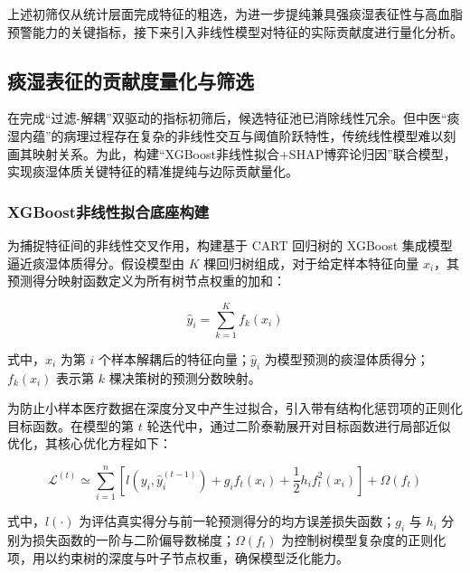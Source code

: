 \documentclass[12pt]{article}
\begin{document}
	{\songti{}
		上述初筛仅从统计层面完成特征的粗选，为进一步提纯兼具强痰湿表征性与高血脂预警能力的关键指标，接下来引入非线性模型对特征的实际贡献度进行量化分析。
		\par}
	
	\subsection{痰湿表征的贡献度量化与筛选}
	{\songti{}
		在完成“过滤-解耦”双驱动的指标初筛后，候选特征池已消除线性冗余。但中医“痰湿内蕴”的病理过程存在复杂的非线性交互与阈值阶跃特性，传统线性模型难以刻画其映射关系。为此，构建“XGBoost非线性拟合+SHAP博弈论归因”联合模型，实现痰湿体质关键特征的精准提纯与边际贡献量化。
		\par}
	
	\subsubsection{XGBoost非线性拟合底座构建}
	{\songti{}
		为捕捉特征间的非线性交叉作用，构建基于 CART 回归树的 XGBoost 集成模型逼近痰湿体质得分。假设模型由 $K$ 棵回归树组成，对于给定样本特征向量 $x_i$，其预测得分映射函数定义为所有树节点权重的加和：
		\par}
	
	\begin{equation}
		\hat{y}_i = \sum_{k=1}^{K} f_k(x_i)
	\end{equation}
	
	{\songti{}
		式中，$x_i$ 为第 $i$ 个样本解耦后的特征向量；$\hat{y}_i$ 为模型预测的痰湿体质得分；$f_k(x_i)$ 表示第 $k$ 棵决策树的预测分数映射。
		\par}
	
	{\songti{}
		为防止小样本医疗数据在深度分叉中产生过拟合，引入带有结构化惩罚项的正则化目标函数。在模型的第 $t$ 轮迭代中，通过二阶泰勒展开对目标函数进行局部近似优化，其核心优化方程如下：
		\par}
	
	\begin{equation}
		\mathcal{L}^{(t)} \simeq \sum_{i=1}^{n} \left[ l(y_i, \hat{y}_i^{(t-1)}) + g_i f_t(x_i) + \frac{1}{2} h_i f_t^2(x_i) \right] + \Omega(f_t)
	\end{equation}
	
	{\songti{}
		式中，$l(\cdot)$ 为评估真实得分与前一轮预测得分的均方误差损失函数；$g_i$ 与 $h_i$ 分别为损失函数的一阶与二阶偏导数梯度；$\Omega(f_t)$ 为控制树模型复杂度的正则化项，用以约束树的深度与叶子节点权重，确保模型泛化能力。
		\par}
	
\end{document}
